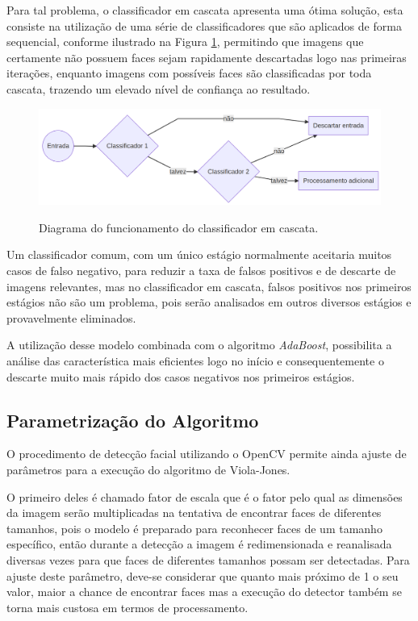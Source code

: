 Para tal problema, o classificador em cascata apresenta uma ótima solução, esta consiste na utilização de uma série de classificadores que são aplicados de forma sequencial, conforme ilustrado na Figura \ref{fig:cascade-classifier}, permitindo que imagens que certamente não possuem faces sejam rapidamente descartadas logo nas primeiras iterações, enquanto imagens com possíveis faces são classificadas por toda cascata, trazendo um elevado nível de confiança ao resultado.

\begin{figure}[htb]
    \centering
    \caption{Diagrama do funcionamento do classificador em cascata.}
    \includegraphics[scale=.2]{figs/cascade-classifier.png}
    \label{fig:cascade-classifier}
 \end{figure}

 Um classificador comum, com um único estágio normalmente aceitaria muitos casos de falso negativo, para reduzir a taxa de falsos positivos e de descarte de imagens relevantes, mas no classificador em cascata, falsos positivos nos primeiros estágios não são um problema, pois serão analisados em outros diversos estágios e provavelmente eliminados.

 A utilização desse modelo combinada com o algoritmo \textit{AdaBoost}, possibilita a análise das característica mais eficientes logo no início e consequentemente o descarte muito mais rápido dos casos negativos nos primeiros estágios.

 \subsection{Parametrização do Algoritmo}

 O procedimento de detecção facial utilizando o OpenCV permite ainda ajuste de parâmetros para a execução do algoritmo de Viola-Jones.

 O primeiro deles é chamado fator de escala que é o fator pelo qual as dimensões da imagem serão multiplicadas na tentativa de encontrar faces de diferentes tamanhos, pois o modelo é preparado para reconhecer faces de um tamanho específico, então durante a detecção a imagem é redimensionada e reanalisada diversas vezes para que faces de diferentes tamanhos possam ser detectadas. Para ajuste deste parâmetro, deve-se considerar que quanto mais próximo de 1 o seu valor, maior a chance de encontrar faces mas a execução do detector também se torna mais custosa em termos de processamento. 

